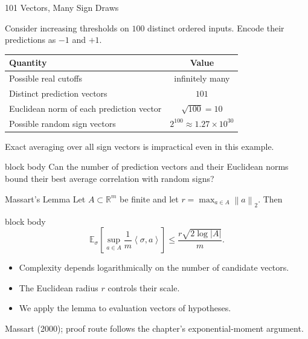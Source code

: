 \documentclass[aspectratio=169,10pt]{beamer}
\newcommand{\E}{\mathbb{E}}
\newcommand{\norm}[1]{\left\lVert #1\right\rVert}
\newcommand{\abs}[1]{\left\lvert #1\right\rvert}
\newcommand{\angles}[1]{\left\langle #1\right\rangle}
\newcommand{\SourceNote}[1]{%
  \vfill
  \begin{flushright}
    {\scriptsize\color{midgray}#1}
  \end{flushright}
}
\newcommand{\KeyBox}[1]{%
  \begin{beamercolorbox}[rounded=true,sep=0.22cm,wd=\linewidth]{block body}
    #1
  \end{beamercolorbox}%
}
\begin{document}
\begin{frame}[t]{101 Vectors, Many Sign Draws}
  \vspace{0.04cm}
  \small

  Consider increasing thresholds on $100$ distinct ordered inputs.
  Encode their predictions as $-1$ and $+1$.
  \begin{center}
  \renewcommand{\arraystretch}{1.15}
  \begin{tabular}{lc}
    \toprule
    Quantity & Value\\
    \midrule
    Possible real cutoffs & infinitely many\\
    Distinct prediction vectors & $101$\\
    Euclidean norm of each prediction vector & $\sqrt{100}=10$\\
    Possible random sign vectors & $2^{100}\approx1.27\times10^{30}$\\
    \bottomrule
  \end{tabular}
  \end{center}
  Exact averaging over all sign vectors is impractical even in this example.
  \vspace{0.15cm}
  \KeyBox{Can the number of prediction vectors and their Euclidean norms
  bound their best average correlation with random signs?}

\end{frame}

\begin{frame}[t]{Massart's Lemma}
  \vspace{0.03cm}
  Let $A\subset\mathbb{R}^m$ be finite and let
  $r=\max_{a\in A}\norm{a}_2$. Then
  \begin{beamercolorbox}[rounded=true,sep=0.20cm,wd=\linewidth]{block body}
    \[
      \boxed{
      \E_\sigma\left[
        \sup_{a\in A}\frac1m\angles{\sigma,a}
      \right]
      \le \frac{r\sqrt{2\log\abs{A}}}{m}.}
    \]
  \end{beamercolorbox}
  \vspace{0.15cm}
  \begin{itemize}
    \setlength{\itemsep}{0.10cm}
    \item Complexity depends logarithmically on the number of candidate vectors.
    \item The Euclidean radius $r$ controls their scale.
    \item We apply the lemma to evaluation vectors of hypotheses.
  \end{itemize}
  \SourceNote{Massart (2000); proof route follows the chapter's exponential-moment argument.}
\end{frame}
\end{document}
